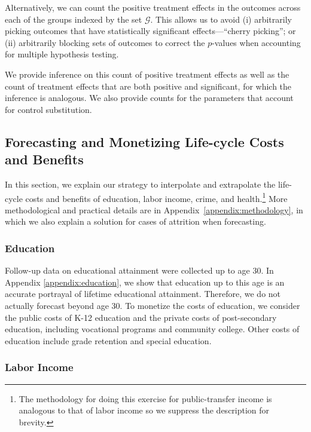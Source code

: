 Alternatively, we can count the positive treatment effects in the outcomes across each of the groups indexed by the set $\mathcal{G}$. This allows us to avoid (i) arbitrarily picking outcomes that have statistically significant effects---``cherry picking''; or (ii) arbitrarily blocking sets of outcomes to correct the $p$-values when accounting for multiple hypothesis testing. 

We provide inference on this count of positive treatment effects as well as the count of treatment effects that are both positive and significant, for which the inference is analogous. We also provide counts for the parameters that account for control substitution. 

\subsection{Forecasting and Monetizing Life-cycle Costs and Benefits} \label{section:cbamethodology}

\noindent In this section, we explain our strategy to interpolate and extrapolate the life-cycle costs and benefits of education, labor income, crime, and health.\footnote{The methodology for doing this exercise for public-transfer income is analogous to that of labor income so we suppress the description for brevity.} More methodological and practical details are in Appendix~\ref{appendix:methodology}, in which we also explain a solution for cases of attrition when forecasting. 

\subsubsection{Education}

Follow-up data on educational attainment were collected up to age 30. In Appendix \ref{appendix:education}, we show that education up to this age is an accurate portrayal of lifetime educational attainment. Therefore, we do not actually forecast beyond age 30. To monetize the costs of education, we consider the public costs of K-12 education and the private costs of post-secondary education, including vocational programs and community college. Other costs of education include grade retention and special education.

\subsubsection{Labor Income}

